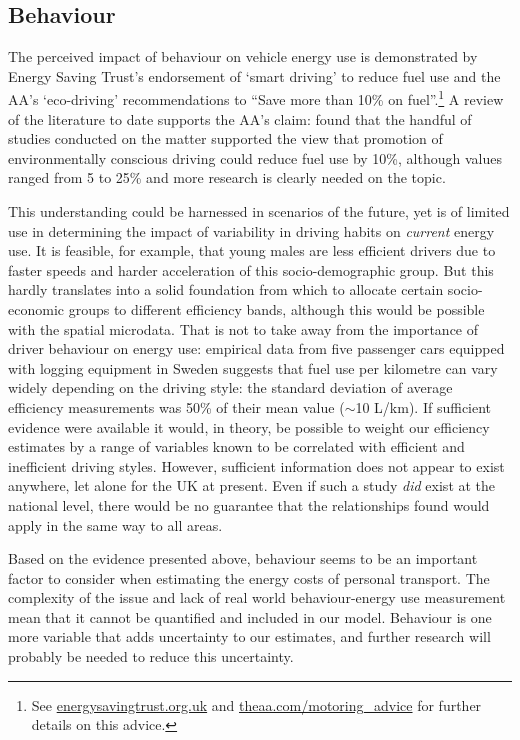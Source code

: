 \documentclass[a4paper, 11pt, twoside]{Thesis}
\begin{document}
\subsection{Behaviour}
The perceived impact of behaviour on vehicle energy use is demonstrated
by Energy Saving Trust's endorsement of `smart driving' to reduce fuel use
 and the AA's `eco-driving' recommendations to ``Save more than 10\% on
 fuel''.\footnote{See
 \href{http://www.energysavingtrust.org.uk/Travel/Driving}{energysavingtrust.org.uk}
and \href{http://www.theaa.com/motoring_advice/fuels-and-environment/drive-smart.html}
{theaa.com/motoring\_advice}
for further details on this advice.
}
A review of the literature to date supports the AA's claim:
\citet{Barkenbus2010} found that the handful of studies conducted
on the matter supported the view that promotion of environmentally conscious
driving could reduce fuel use by 10\%, although values ranged from 5 to 25\%
and more research is clearly needed on the topic.

This understanding could be harnessed in scenarios of the future, yet is of limited
use in determining the impact of variability in driving habits on \emph{current}
energy use. It is feasible, for example, that young males are less efficient drivers
due to faster speeds \citep{fleiter2007choosing} and harder acceleration
of this socio-demographic group. But this hardly translates into a
solid foundation from which to allocate certain socio-economic groups
to different efficiency bands, although this would be possible with the
spatial microdata. That is not to take away from the importance of driver
behaviour on energy use: 
empirical data from five passenger cars equipped with
logging equipment in Sweden \citep{Ericsson2001a} suggests that
fuel use per kilometre can vary widely depending on the driving style:
the standard deviation of average efficiency measurements was 50\%
of their mean value ($\sim$10 L/km). If sufficient evidence were available
it would, in theory, be possible to weight our efficiency estimates
by a range of variables known to be correlated with efficient and
inefficient driving styles. However, sufficient information does
not appear to exist anywhere, let alone for the UK at present.
Even if such a study \emph{did} exist at the national level,
there would be no guarantee that the relationships found would apply in the
same way to all areas.

Based on the evidence presented above, behaviour seems to be an important factor
to consider when estimating the energy costs of personal transport.
The complexity of the issue and lack of real world behaviour-energy use
measurement mean that it cannot be quantified and included in our model.
Behaviour is one more variable that adds uncertainty to our estimates,
and further research will probably be needed to reduce this uncertainty.
\end{document}
